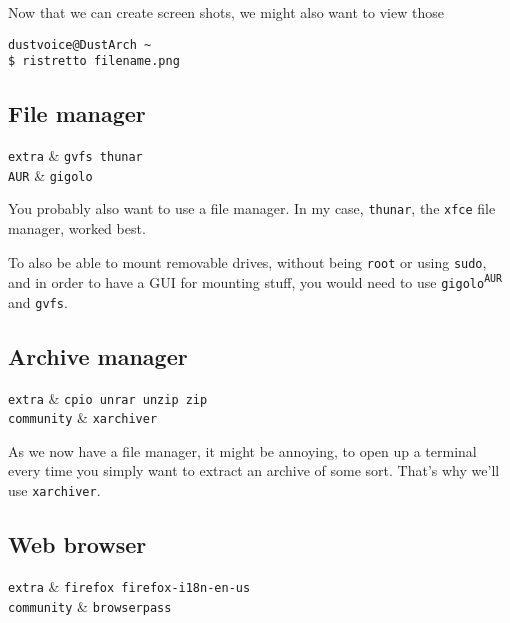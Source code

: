 \documentclass[10pt]{dustdoc}
\begin{document}
Now that we can create screen shots, we might also want to view those

\begin{verbatim}
dustvoice@DustArch ~
$ ristretto filename.png
\end{verbatim}

\subsection{File manager}
\label{sec:file-manager}

\begin{packagetable}
    \texttt{extra} & \texttt{gvfs thunar} \\
    \texttt{AUR} & \texttt{gigolo} \\
\end{packagetable}

You probably also want to use a file manager.
In my case, \texttt{thunar}, the \texttt{xfce} file manager, worked best.

To also be able to mount removable drives, without being \texttt{root} or using \texttt{sudo}, and in order to have a GUI for mounting stuff, you would need to use \texttt{gigolo\textsuperscript{\texttt{AUR}}} and \texttt{gvfs}.

\subsection{Archive manager}
\label{sec:archive-manager}

\begin{packagetable}
    \texttt{extra} & \texttt{cpio unrar unzip zip} \\
    \texttt{community} & \texttt{xarchiver} \\
\end{packagetable}

As we now have a file manager, it might be annoying, to open up a terminal every time you simply want to extract an archive of some sort.
That’s why we’ll use \texttt{xarchiver}.

\subsection{Web browser}
\label{sec:web-browser}

\begin{packagetable}
    \texttt{extra} & \texttt{firefox firefox-i18n-en-us} \\
    \texttt{community} & \texttt{browserpass} \\
\end{packagetable}
\end{document}

